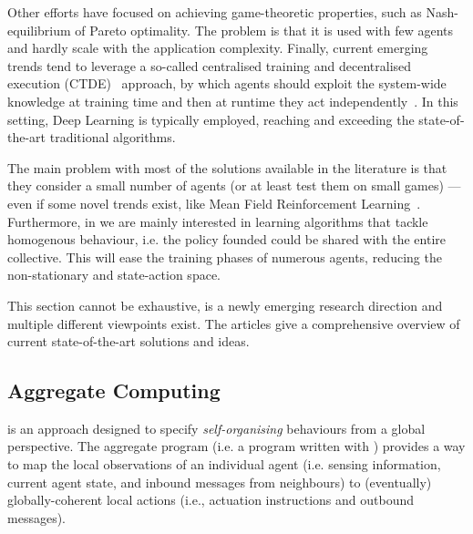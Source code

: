 \documentclass[11pt]{article}
\begin{document}
Other efforts have focused on achieving game-theoretic properties, such as Nash-equilibrium of Pareto optimality.
The problem is that it is used with few agents and hardly scale with the application complexity.
%
Finally, current emerging trends tend to leverage a so-called centralised training and decentralised execution (CTDE)~\cite{DBLP:journals/tcyb/NguyenNN20} approach, by which 
 agents should exploit the system-wide knowledge at training time and then at runtime they act independently~\cite{DBLP:journals/aamas/Hernandez-LealK19}. In this setting, Deep Learning is typically employed, reaching and exceeding the state-of-the-art traditional \marl{} algorithms.
 
The main problem with most of the solutions available in the literature is that they consider a small number of agents (or at least test them on small games) --- even if some novel trends exist, like Mean Field Reinforcement Learning~\cite{DBLP:journals/corr/abs-2108-02731}.
Furthermore, in \cpsw{} we are mainly interested in learning algorithms that tackle homogenous behaviour, i.e. the policy founded could be shared with the entire collective. This will ease the training phases of numerous agents, reducing the non-stationary and state-action space.

This section cannot be exhaustive, \marl{} is a newly emerging research direction and multiple different viewpoints exist. The articles \cite{DBLP:journals/aamas/Hernandez-LealK19, DBLP:journals/corr/abs-1911-10635, DBLP:journals/corr/abs-1908-03963} give a comprehensive overview of current state-of-the-art solutions and ideas.
\subsection{Aggregate Computing}

\ac{} is an approach designed to specify \emph{self-organising} behaviours from a global perspective.
%
The aggregate program (i.e. a program written with \ac{}) provides a way to map the local observations of an individual agent (i.e. sensing information, current agent state, and inbound messages from neighbours) to (eventually) globally-coherent local actions
 (i.e., actuation instructions and outbound messages).
%
\end{document}
